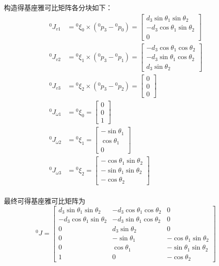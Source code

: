 \documentclass[UTF8, 12pt]{ctexart}
\begin{document}
构造得基座雅可比矩阵各分块如下：
\[
\begin{aligned}
    {}^0 J_{v1} &= {}^0\xi_0 \times ({}^0 p_3 - {}^0 p_0)
                = \begin{bmatrix}
                    d_3 \sin\theta_1 \sin\theta_2 \\
                    -d_3 \cos\theta_1 \sin\theta_2 \\
                    0
                \end{bmatrix} \\
    {}^0 J_{v2} &= {}^0\xi_1 \times ({}^0 p_3 - {}^0 p_1)
                = \begin{bmatrix}
                    -d_3 \cos\theta_1 \cos\theta_2 \\
                    -d_3 \sin\theta_1 \cos\theta_2 \\
                    d_3 \sin\theta_2
                \end{bmatrix} \\
    {}^0 J_{v3} &= {}^0\xi_2 \times ({}^0 p_3 - {}^0 p_2)
                = \begin{bmatrix}
                    0 \\
                    0 \\
                    0
                \end{bmatrix} \\
    {}^0 J_{\omega1} &= {}^0\xi_0
                = \begin{bmatrix}
                    0 \\ 0 \\ 1
                \end{bmatrix} \\
    {}^0 J_{\omega2} &= {}^0\xi_1
                = \begin{bmatrix}
                    -\sin\theta_1 \\ \cos\theta_1 \\ 0
                \end{bmatrix} \\
    {}^0 J_{\omega3} &= {}^0\xi_2
                = \begin{bmatrix}
                    -\cos\theta_1 \sin\theta_2 \\ -\sin\theta_1 \sin\theta_2 \\ -\cos\theta_2
                \end{bmatrix} \\
\end{aligned}
\]

最终可得基座雅可比矩阵为
\[
{}^0 J =
\begin{bmatrix}
    d_3 \sin\theta_1 \sin\theta_2 & -d_3 \cos\theta_1 \cos\theta_2 & 0 \\
    -d_3 \cos\theta_1 \sin\theta_2 & -d_3 \sin\theta_1 \cos\theta_2 & 0 \\
    0 & d_3 \sin\theta_2 & 0 \\
    0 & -\sin\theta_1 & -\cos\theta_1 \sin\theta_2 \\
    0 & \cos\theta_1 & -\sin\theta_1 \sin\theta_2 \\
    1 & 0 & -\cos\theta_2
\end{bmatrix}
\]
\vspace{5em}
\end{document}
